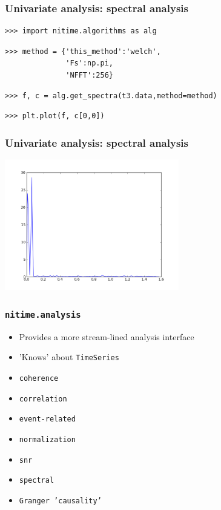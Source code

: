 \documentclass{beamer}
\begin{document}
\begin{frame}[fragile]
\frametitle{Univariate analysis: spectral analysis }
\begin{lstlisting}
>>> import nitime.algorithms as alg
\end{lstlisting}
\pause
\begin{lstlisting}
>>> method = {'this_method':'welch',
              'Fs':np.pi,
              'NFFT':256}
\end{lstlisting}
\pause
\begin{lstlisting}
>>> f, c = alg.get_spectra(t3.data,method=method)
\end{lstlisting}
\pause
\begin{lstlisting}
>>> plt.plot(f, c[0,0])
\end{lstlisting}
\end{frame}

\begin{frame}
\frametitle{Univariate analysis: spectral analysis}
\includegraphics[height=5.7cm]{figures/outa_phase_tseries_single_psd}
\end{frame}

\begin{frame}
\frametitle{\tt{nitime.analysis}}
\begin{itemize}
\pause
\item 
Provides a more stream-lined analysis interface
\pause
\item 
'Knows' about \tt{TimeSeries} 
\pause
\item
\tt{coherence}
\pause
\item
\tt{correlation}
\pause
\item
\tt{event-related}
\pause
\item
\tt{normalization}
\pause
\item
\tt{snr}
\item
\pause
\tt{spectral}
\item
\pause
\tt{Granger 'causality'}
\end{itemize}
\end{frame}
\end{document}
